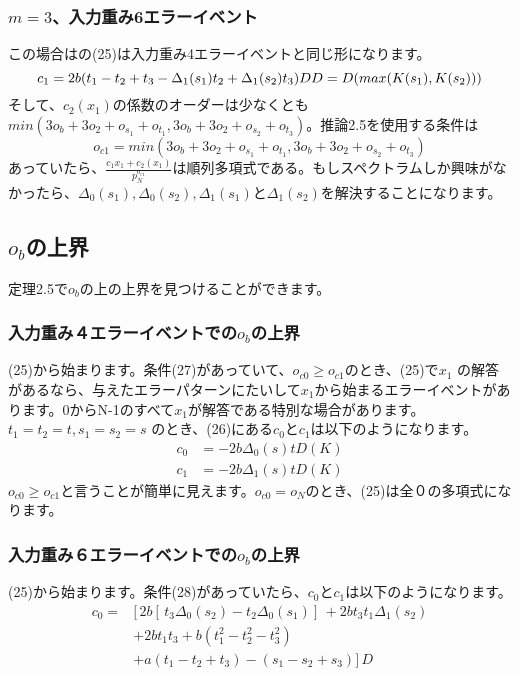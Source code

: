 \documentclass[20 pts]{article}
\begin{document}
\subsubsection{$m=3$、入力重み6エラーイベント}
この場合はの(25)は入力重み4エラーイベントと同じ形になります。
$$c_1=2b(t_1-t_2+t_3-\Delta_1(s_1)t_2+\Delta_1(s_2)t_3)D\\
D=D(max(K(s_1),K(s_2)))$$
そして、$c_2(x_1)$の係数のオーダーは少なくとも$min(3o_b+3o_2+o_{s_1}+o_{t_1},3o_b+3o_2+o_{s_2}+o_{t_3})$。推論2.5を使用する条件は
\begin{equation}\tag{28}
o_{c1}=min(3o_b+3o_2+o_{s_1}+o_{t_1},3o_b+3o_2+o_{s_2}+o_{t_3})
\end{equation}
あっていたら、$\frac{c_1 x_1+c_2 (x_1 )}{p_N^{o_{c1}} }$は順列多項式である。もしスペクトラムしか興味がなかったら、$\Delta_0 (s_1 ), \Delta_0 (s_2 ), \Delta_1 (s_1 )$と$\Delta_1 (s_2 )$を解決することになります。

\subsection{$o_b$の上界}
定理2.5で$o_b$の上の上界を見つけることができます。
\subsubsection{入力重み４エラーイベントでの$o_b$の上界}
(25)から始まります。条件(27)があっていて、$o_{c0}  \geq o_{c1}$のとき、(25)で$x_1$  の解答があるなら、与えたエラーパターンにたいして$x_1$から始まるエラーイベントがあります。0からN-1のすべて$x_1$が解答である特別な場合があります。$t_1= t_2=t,s_1=s_2=s$ のとき、(26)にある$c_0$と$c_1$は以下のようになります。
\begin{equation*}
\begin{split}
c_0&=-2b\Delta_0(s)tD(K)\\
c_1&=-2b\Delta_1(s)tD(K)
\end{split}
\end{equation*}
$o_{c0}  \geq o_{c1}$と言うことが簡単に見えます。$o_{c0}=o_N$のとき、(25)は全０の多項式になります。

\subsubsection{入力重み６エラーイベントでの$o_b$の上界}
(25)から始まります。条件(28)があっていたら、$c_0$と$c_1$は以下のようになります。
\begin{equation}\tag{30}
\begin{split}
c_0=&[\, 2b[\,t_3\Delta_0(s_2)-t_2\Delta_0(s_1)]\,+2bt_3t_1\Delta_1(s_2)\\
&+2bt_1t_3+b(t_1^2-t_2^2-t_3^2)\\
&+a(t_1-t_2+t_3)-(s_1-s_2+s_3) ]\,D
\end{split}
\end{equation}
\end{document}
